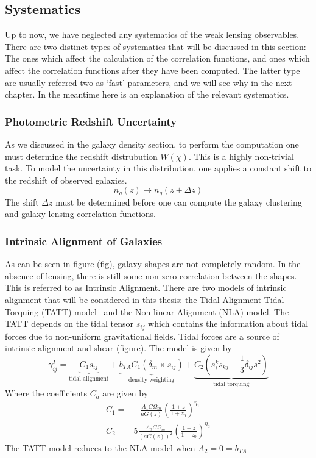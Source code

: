 \subsection{Systematics}
Up to now, we have neglected any systematics of the weak lensing observables. There are two distinct types of systematics that will be discussed in this section: The ones which affect the calculation of the correlation functions, and ones which affect the correlation functions after they have been computed. The latter type are usually referred two as `fast' parameters, and we will see why in the next chapter. In the meantime here is an explanation of the relevant systematics.
\subsubsection{Photometric Redshift Uncertainty}
As we discussed in the galaxy density section, to perform the computation one must determine the redshift distrubution $W(\chi)$. This is a highly non-trivial task. To model the uncertainty in this distribution, one applies a constant shift to the redshift of observed galaxies.
\begin{equation}
	n_g(z) \mapsto n_g(z+\Delta z)
\end{equation}
The shift $\Delta z$ must be determined before one can compute the galaxy clustering and galaxy lensing correlation functions.
\subsubsection{Intrinsic Alignment of Galaxies}
As can be seen in figure (fig), galaxy shapes are not completely random. In the absence of lensing, there is still some non-zero correlation between the shapes. This is referred to as Intrinsic Alignment. There are two models of intrinsic alignment that will be considered in this thesis: the Tidal Alignment Tidal Torquing (TATT) model~\cite{krause_dark_2021,blazek_beyond_2019} and the Non-linear Alignment (NLA) model. The TATT depends on the tidal tensor $s_{ij}$ which contains the information about tidal forces due to non-uniform gravitational fields. Tidal forces are a source of intrinsic alignment and shear (figure). The model is given by
\begin{equation}
	\gamma_{ij}^I = \underbrace{C_1s_{ij}}_{\text{tidal alignment}}+
	\underbrace{b_{TA}C_1(\delta_m\times s_{ij})}_{\text{density weighting}}+
	\underbrace{C_2\left( s_i^ks_{kj}-\frac{1}{3}\delta_{ij}s^2 \right)}_{\text{tidal torquing}}
\end{equation}
Where the coefficients $C_a$ are given by
\begin{equation}
	\begin{split}
		C_1 =& -\frac{A_1\bar{C}\Omega_m}{aG(z)}\left(\frac{1+z}{1+z_0}\right)^{\eta_1} \\
		C_2 =& 5\frac{A_2\bar{C}\Omega_m}{(aG(z))^2}\left(\frac{1+z}{1+z_0}\right)^{\eta_2}
	\end{split}
\end{equation}
The TATT model reduces to the NLA model when $A_2=0=b_{TA}$
